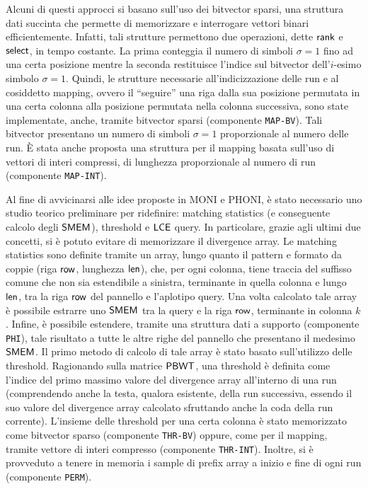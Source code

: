 \documentclass[a4paper,11pt, oneside,italian]{article}
\def\rank{\mbox{\rm {\sf rank}}}
\def\LCE{\mbox{\rm {\sf LCE}}}
\def\select{\mbox{\rm {\sf select}}}
\def\len{\mbox{\rm {\sf len}}}
\def\row{\mbox{\rm {\sf row}}}
\def\PBWT{\mbox{\rm {\sf PBWT}}}
\def\SMEM{\mbox{\rm {\sf SMEM}}}
\def\LCE{\mbox{\rm {\sf LCE}}}
\begin{document}
Alcuni di questi approcci si basano sull'uso dei bitvector 
sparsi, una struttura dati succinta che permette di memorizzare e interrogare
vettori binari efficientemente. Infatti, tali strutture permettono due
operazioni, dette $\rank$ e $\select$, in tempo costante. La prima conteggia il 
numero di simboli $\sigma=1$ fino ad una certa posizione mentre la seconda
restituisce l'indice sul bitvector dell'$i$-esimo simbolo $\sigma=1$. 
Quindi, le strutture necessarie all'indicizzazione delle run e al cosiddetto
mapping, ovvero il ``seguire'' una riga dalla sua posizione permutata in una
certa colonna alla posizione permutata nella colonna successiva,
sono state implementate, anche, tramite bitvector sparsi (componente
\texttt{MAP-BV}). Tali bitvector presentano un numero di simboli 
$\sigma=1$ proporzionale al numero delle run. È stata anche proposta una
struttura per il mapping basata sull'uso di vettori di interi 
compressi, di lunghezza proporzionale al numero di run (componente
\texttt{MAP-INT}).  

Al fine di avvicinarsi alle idee proposte in MONI e PHONI, è
stato necessario uno studio teorico preliminare per ridefinire: matching
statistics (e conseguente calcolo degli $\SMEM$), threshold e $\LCE$ query. In
particolare, grazie agli  
ultimi due concetti, si è potuto evitare di memorizzare il divergence array.
Le matching statistics sono definite tramite un array,
lungo quanto il pattern e formato da coppie (riga $\row$, lunghezza $\len$),
che, per ogni colonna, tiene traccia del suffisso comune che non sia estendibile
a sinistra, terminante in quella colonna e lungo $\len$, tra la riga $\row$ del
pannello e l'aplotipo query. Una volta calcolato tale
array è possibile estrarre uno $\SMEM$ tra la query e
la riga $\row$, terminante in colonna $k$. Infine, è possibile estendere,
tramite una struttura dati a 
supporto (componente \texttt{PHI}), tale risultato 
a tutte le altre righe del pannello che presentano il medesimo $\SMEM$.
Il primo metodo di calcolo di tale array è stato basato sull'utilizzo delle
threshold. Ragionando sulla matrice $\PBWT$, una threshold è definita
come l'indice del primo massimo valore del divergence array all'interno di una
run (comprendendo anche la testa, qualora esistente, della run successiva,
essendo 
il suo valore del divergence array calcolato sfruttando anche la coda della run
corrente). L'insieme delle threshold per una certa colonna è stato memorizzato
come bitvector sparso (componente \texttt{THR-BV}) oppure, come per il mapping,
tramite vettore di interi compresso (componente \texttt{THR-INT}). Inoltre, si è
provveduto a tenere in memoria i  
sample di prefix array a inizio e fine di ogni run (componente \texttt{PERM}). 
\end{document}
